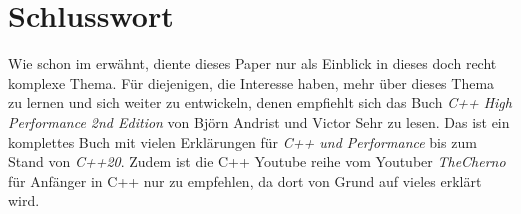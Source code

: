 \section{Schlusswort}\label{sec:schlusswort}
Wie schon im \emph{} erwähnt, diente dieses Paper nur als Einblick in dieses
doch recht komplexe Thema. Für diejenigen, die Interesse haben, mehr über dieses Thema zu lernen
und sich weiter zu entwickeln, denen empfiehlt sich das Buch \emph{C++ High Performance 2nd
Edition} von Björn Andrist und Victor Sehr zu lesen. Das ist ein komplettes Buch mit vielen
Erklärungen für \emph{C++ und Performance} bis zum Stand von \emph{C++20}. Zudem ist die C++
Youtube reihe vom Youtuber \emph{TheCherno} für Anfänger in C++ nur zu empfehlen, da dort von
Grund auf vieles erklärt wird.
